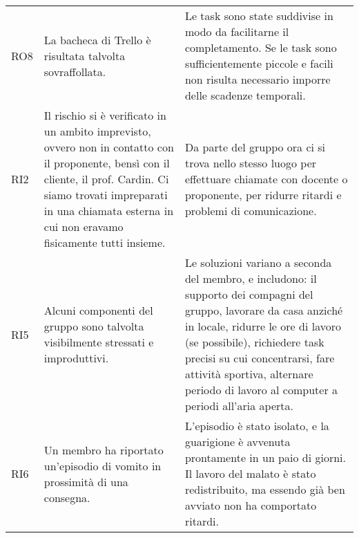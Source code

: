 \begin{longtable}{
		 >{\centering}p{}
		 >{}p{}
		 >{}p{}
	 }
	RO8 &
	La bacheca di Trello è risultata talvolta sovraffollata. &
	Le task sono state suddivise in modo da facilitarne il completamento. Se le task sono sufficientemente piccole e facili non risulta necessario imporre delle scadenze temporali. 
	\tabularnewline
	
	RI2 &
	Il rischio si è verificato in un ambito imprevisto, ovvero non in contatto con il proponente, bensì con il cliente, il prof. Cardin. Ci siamo trovati impreparati in una chiamata esterna in cui non eravamo fisicamente tutti insieme.&
	Da parte del gruppo ora ci si trova nello stesso luogo per effettuare chiamate con docente o proponente, per ridurre ritardi e problemi di comunicazione.
	\tabularnewline
	
	RI5 &
	Alcuni componenti del gruppo sono talvolta visibilmente stressati e improduttivi. &
	Le soluzioni variano a seconda del membro, e includono: il supporto dei compagni del gruppo, lavorare da casa anziché in locale, ridurre le ore di lavoro (se possibile), richiedere task precisi su cui concentrarsi, fare attività sportiva, alternare periodo di lavoro al computer a periodi all'aria aperta.
	\tabularnewline
	
	RI6 &
	Un membro ha riportato un'episodio di vomito in prossimità di una consegna. & L'episodio è stato isolato, e la guarigione è avvenuta prontamente in un paio di giorni. Il lavoro del malato è stato redistribuito, ma essendo già ben avviato non ha comportato ritardi.
	\tabularnewline
	
		
\end{longtable}

